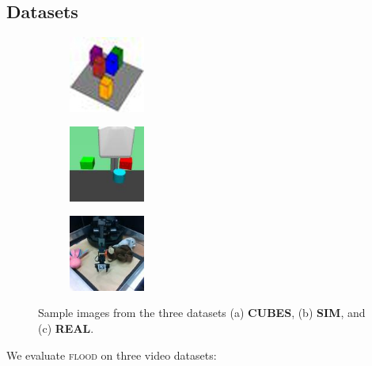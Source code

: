 \documentclass{article}
\newcommand{\jd}[1]{\textcolor{orange}{[DJ: #1]}}
\begin{document}



\subsection{Datasets}
\begin{figure}
\begin{subfigure}{.3\linewidth}
\centering
\includegraphics[width=2.5cm]{figs/cubes.jpg}
\caption{}
\label{fig:sub1}
\end{subfigure}%
\begin{subfigure}{.3\linewidth}
\centering
\includegraphics[width=2.5cm]{figs/sim.jpg}
\caption{}
\label{fig:sub2}
\end{subfigure}
\begin{subfigure}{.3\linewidth}
\centering
\includegraphics[width=2.5cm]{figs/real.jpg}
\caption{}
\label{fig:sub3}
\end{subfigure}
\caption{Sample images from the three datasets (a) \textbf{CUBES}, (b) \textbf{SIM}, and (c) \textbf{REAL}.}
\label{fig:datasets}
\end{figure}
We evaluate \textsc{flood} on three video datasets: 
\end{document}
